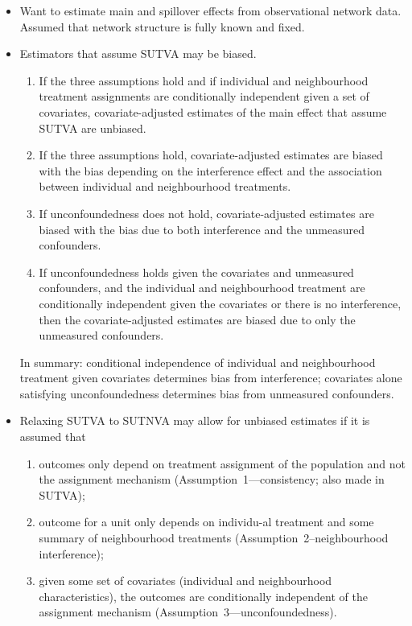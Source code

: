 \documentclass[10pt]{article}
\begin{document}
\begin{itemize}

\item
Want to estimate main and spillover effects from observational network data. Assumed that network structure is fully known and fixed.

\item
Estimators that assume SUTVA may be biased.
\begin{enumerate}
\item
If the three assumptions hold and if individual and neighbourhood treatment assignments are conditionally independent given a set of covariates, covariate-adjusted estimates of the main effect that assume SUTVA are unbiased.
\item
If the three assumptions hold, covariate-adjusted estimates are biased with the bias depending on the interference effect and the association between individual and neighbourhood treatments.
\item
If unconfoundedness does not hold, covariate-adjusted estimates are biased with the bias due to both interference and the unmeasured confounders.
\item
If unconfoundedness holds given the covariates and unmeasured confounders, and the individual and neighbourhood treatment are conditionally independent given the covariates or there is no interference, then the covariate-adjusted estimates are biased due to only the unmeasured confounders.
\end{enumerate}
In summary: conditional independence of individual and neighbourhood treatment given covariates determines bias from interference; covariates alone satisfying unconfoundedness determines bias from unmeasured confounders.

\item
Relaxing SUTVA to SUTNVA may allow for unbiased estimates if it is assumed that
\begin{enumerate}
\item
outcomes only depend on treatment assignment of the population and not the assignment mechanism (Assumption~1---consistency; also made in SUTVA);
\item
outcome for a unit only depends on individu-al treatment and some summary of neighbourhood treatments (Assumption~2--neighbourhood interference);
\item
given some set of covariates (individual and neighbourhood characteristics), the outcomes are conditionally independent of the assignment mechanism (Assumption~3---unconfoundedness).
\end{enumerate}


\end{itemize}
\end{document}
